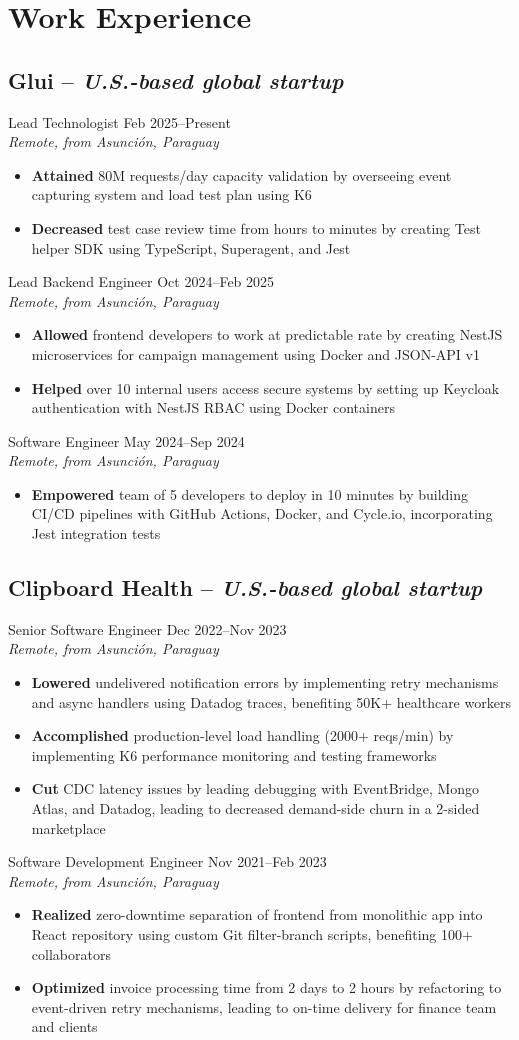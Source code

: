 \documentclass[11pt,a4paper]{article}
\newcommand{\actionverb}[1]{\textcolor{actioncolor}{\textbf{#1}}}
\newcommand{\cvcompany}[3]{
  \subsection{#1 \textcolor{mediumgray}{#2}}
  #3
}
\newcommand{\cvrole}[4]{
  \large{#1} \hfill \textcolor{mediumgray}{\small #2}\\
  \normalsize\textit{#3}
  \begin{itemize}
    #4
  \end{itemize}
  \vspace{1em}
}
\begin{document}
\section{Work Experience}

\cvcompany{Glui}{-- \textit{U.S.-based global startup}}{

  \cvrole{Lead Technologist}{Feb 2025--Present}{Remote, from Asunción, Paraguay}{
    \item \actionverb{Attained} 80M requests/day capacity validation by overseeing event capturing system and load test plan using K6
    \item \actionverb{Decreased} test case review time from hours to minutes by creating Test helper SDK using TypeScript, Superagent, and Jest
  }
  
  \cvrole{Lead Backend Engineer}{Oct 2024--Feb 2025}{Remote, from Asunción, Paraguay}{
    \item \actionverb{Allowed} frontend developers to work at predictable rate by creating NestJS microservices for campaign management using Docker and JSON-API v1
    \item \actionverb{Helped} over 10 internal users access secure systems by setting up Keycloak authentication with NestJS RBAC using Docker containers
  }
  
  \cvrole{Software Engineer}{May 2024--Sep 2024}{Remote, from Asunción, Paraguay}{
    \item \actionverb{Empowered} team of 5 developers to deploy in 10 minutes by building CI/CD pipelines with GitHub Actions, Docker, and Cycle.io, incorporating Jest integration tests
  }
}

\cvcompany{Clipboard Health}{-- \textit{U.S.-based global startup}}{
  \cvrole{Senior Software Engineer}{Dec 2022--Nov 2023}{Remote, from Asunción, Paraguay}{
    \item \actionverb{Lowered} undelivered notification errors by implementing retry mechanisms and async handlers using Datadog traces, benefiting 50K+ healthcare workers
    \item \actionverb{Accomplished} production-level load handling (2000+ reqs/min) by implementing K6 performance monitoring and testing frameworks
    \item \actionverb{Cut} CDC latency issues by leading debugging with EventBridge, Mongo Atlas, and Datadog, leading to decreased demand-side churn in a 2-sided marketplace
  }
  
  \cvrole{Software Development Engineer}{Nov 2021--Feb 2023}{Remote, from Asunción, Paraguay}{
    \item \actionverb{Realized} zero-downtime separation of frontend from monolithic app into React repository using custom Git filter-branch scripts, benefiting 100+ collaborators
    \item \actionverb{Optimized} invoice processing time from 2 days to 2 hours by refactoring to event-driven retry mechanisms, leading to on-time delivery for finance team and clients
  }
}
\end{document}

